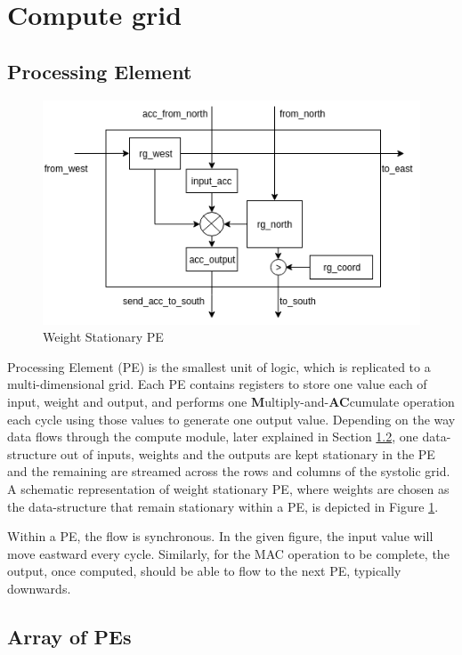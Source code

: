 \section{Compute grid}

\subsection{Processing Element}

\begin{figure}[h]
    \centering
    \includegraphics[scale=0.5]{images/PE.png}
    \caption{Weight Stationary PE}
    \label{fig:fig1}
\end{figure}

Processing Element (PE) is the smallest unit of logic, which is replicated to a multi-dimensional grid. Each PE contains registers to store one value each of input, weight and output, and performs one \textbf{M}ultiply-and-\textbf{AC}cumulate operation each cycle using those values to generate one output value. Depending on the way data flows through the compute module, later explained in Section \ref{}, one data-structure out of inputs, weights and the outputs are kept stationary in the PE and the remaining are streamed across the rows and columns of the systolic grid. A schematic representation of weight stationary PE, where weights are chosen as the data-structure that remain stationary within a PE, is depicted in Figure \ref{fig:fig1}.

Within a PE, the flow is synchronous. In the given figure, the input value will move eastward every cycle. Similarly, for the MAC operation to be complete, the output, once computed, should be able to flow to the next PE, typically downwards.

\subsection{Array of PEs}

